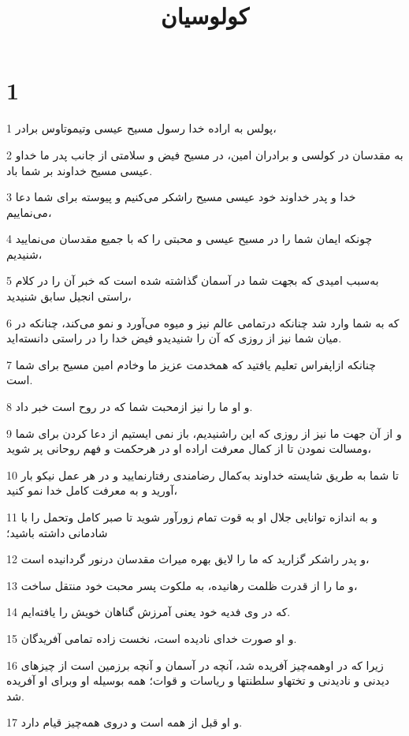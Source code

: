 

\title{کولوسيان}


\chapter{1}

\par 1 پولس به اراده خدا رسول مسیح عیسی وتیموتاوس برادر،
\par 2 به مقدسان در کولسی و برادران امین، در مسیح فیض و سلامتی از جانب پدر ما خداو عیسی مسیح خداوند بر شما باد.
\par 3 خدا و پدر خداوند خود عیسی مسیح راشکر می‌کنیم و پیوسته برای شما دعا می‌نماییم،
\par 4 چونکه ایمان شما را در مسیح عیسی و محبتی را که با جمیع مقدسان می‌نمایید شنیدیم،
\par 5 به‌سبب امیدی که بجهت شما در آسمان گذاشته شده است که خبر آن را در کلام راستی انجیل سابق شنیدید،
\par 6 که به شما وارد شد چنانکه درتمامی عالم نیز و میوه می‌آورد و نمو می‌کند، چنانکه در میان شما نیز از روزی که آن را شنیدیدو فیض خدا را در راستی دانسته‌اید.
\par 7 چنانکه ازاپفراس تعلیم یافتید که همخدمت عزیز ما وخادم امین مسیح برای شما است.
\par 8 و او ما را نیز ازمحبت شما که در روح است خبر داد.
\par 9 و از آن جهت ما نیز از روزی که این راشنیدیم، باز نمی ایستیم از دعا کردن برای شما ومسالت نمودن تا از کمال معرفت اراده او در هرحکمت و فهم روحانی پر شوید،
\par 10 تا شما به طریق شایسته خداوند به‌کمال رضامندی رفتارنمایید و در هر عمل نیکو بار آورید و به معرفت کامل خدا نمو کنید،
\par 11 و به اندازه توانایی جلال او به قوت تمام زورآور شوید تا صبر کامل وتحمل را با شادمانی داشته باشید؛
\par 12 و پدر راشکر گزارید که ما را لایق بهره میراث مقدسان درنور گردانیده است،
\par 13 و ما را از قدرت ظلمت رهانیده، به ملکوت پسر محبت خود منتقل ساخت،
\par 14 که در وی فدیه خود یعنی آمرزش گناهان خویش را یافته‌ایم.
\par 15 و او صورت خدای نادیده است، نخست زاده تمامی آفریدگان.
\par 16 زیرا که در اوهمه‌چیز آفریده شد، آنچه در آسمان و آنچه برزمین است از چیزهای دیدنی و نادیدنی و تختهاو سلطنتها و ریاسات و قوات؛ همه بوسیله او وبرای او آفریده شد.
\par 17 و او قبل از همه است و دروی همه‌چیز قیام دارد.
